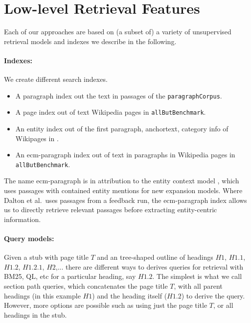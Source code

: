 \documentclass{article}
\begin{document}
\section{Low-level Retrieval Features}

Each of our approaches are based on (a subset of) a variety of unsupervised retrieval models and indexes we describe in the following.

\paragraph{Indexes:}

We create different search indexes. 
\begin{itemize}
    \item A paragraph index out the text in passages of the \texttt{paragraphCorpus}.
    \item A page index out of text Wikipedia pages in \texttt{allButBenchmark}. 
    \item An entity index out of the first paragraph, anchortext, category info of Wikipages in .
    \item An ecm-paragraph index out of text in paragraphs in Wikipedia pages in \texttt{allButBenchmark}.
\end{itemize}

The name ecm-paragraph is in attribution to the entity context model \cite{dalton2014entity}, which uses passages with contained entity mentions for new expansion models. Where Dalton et al.\ uses passages from a feedback run, the ecm-paragraph index allows us to directly retrieve relevant passages before extracting entity-centric information.

\paragraph{Query models:}
Given a stub with page title $T$ and an tree-shaped outline of headings $H1$, $H1.1$, $H1.2$, $H1.2.1$, $H2$,... there are different ways to derives queries for retrieval with BM25, QL, etc for a particular heading, say $H1.2$. The simplest is what we call section path queries, which concatenates the page title $T$, with all parent headings (in this example $H1$) and the heading itself ($H1.2$) to derive the query. However, more options are possible such as using just the page title $T$, or all headings in the stub.
\end{document}
